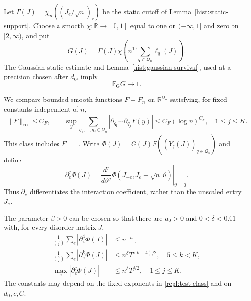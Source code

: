 Let $\Gamma(J)=\chi_n((J_e/\sqrt n)_e)$ be the static cutoff of
Lemma~\ref{hist:static-support}.
Choose a smooth $\chi:\mathbb R\to[0,1]$ equal to one on $(-\infty,1]$
and zero on $[2,\infty)$, and put
\begin{equation}\label{repl:outer-cutoff}
 G(J)=\Gamma(J)\chi\left(n^{10}\sum_{q\in\mathcal Q_n}\ell_q(J)\right).
\end{equation}
The Gaussian static estimate and Lemma~\ref{hist:gaussian-survival}, used at a
precision chosen after $d_0$, imply
\begin{equation}\label{repl:gaussian-cutoff}
 \mathbb E_{\mathrm{G}}G\longrightarrow1.
\end{equation}

We compare bounded smooth functions $F=F_n$ on
$\mathbb R^{\mathcal Q_n}$ satisfying, for fixed constants independent of
$n$,
\begin{equation}\label{repl:test-class}
 \|F\|_\infty\le C_F,\qquad
 \sup_y\sum_{q_1,\ldots,q_j\in\mathcal Q_n}
 \left|\partial_{q_1}\cdots\partial_{q_j}F(y)\right|
 \le C_F(\log n)^{C_F},\quad 1\le j\le K .
\end{equation}
This class includes $F=1$.  Write
$\Phi(J)=G(J)F((\widetilde Y_q(J))_{q\in\mathcal Q_n})$ and define
\[
 \partial_e^j\Phi(J)
 =\left.\frac{d^j}{d\vartheta^j}
       \Phi(J_{-e},J_e+\sqrt n\,\vartheta)\right|_{\vartheta=0}.
\]
Thus $\partial_e$ differentiates the interaction coefficient, rather than
the unscaled entry $J_e$.

\begin{lemma}\label{repl:observable-derivatives}
The parameter $\beta>0$ can be chosen so that there are
$a_0>0$ and $0<\delta<0.01$ with, for every disorder matrix $J$,
\begin{align}
 \frac1{\binom n2}\sum_e|\partial_e^4\Phi(J)|
     &\le n^{-a_0},                                           \label{repl:fourth-derivative}\\
 \frac1{\binom n2}\sum_e|\partial_e^k\Phi(J)|
     &\le n^\delta T^{(k-4)/2},\quad 5\le k<K,               \label{repl:higher-derivative}\\
 \max_e|\partial_e^j\Phi(J)|
     &\le n^\delta T^{j/2},\quad 1\le j\le K.                \label{repl:global-derivative}
\end{align}
The constants may depend on the fixed exponents in
\eqref{repl:test-class} and on $d_0,c,C$.
\end{lemma}

